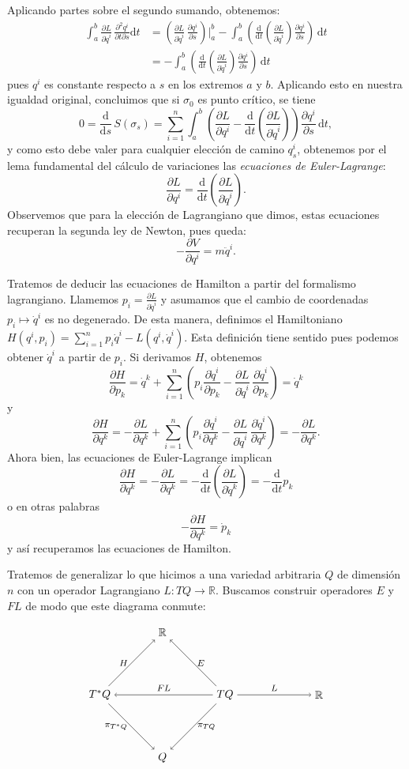 \documentclass[11pt, a4paper]{article}
\newcommand{\RR}{\mathbb{R}}
\newcommand{\dd}{\mathrm{d}}
\newcommand{\ddt}{\frac{\dd}{\dd t}}
\newcommand{\dds}{\frac{\dd}{\dd s}}
\newcommand{\pardev}[2]{\frac{\partial #1}{\partial #2}}
\theoremstyle{plain}
\theoremstyle{definition}
\begin{document}
Aplicando partes sobre el segundo sumando, obtenemos:
\begin{align*}
\int_a^b \pardev{L}{\dot{q}^i}\,\frac{\partial^2 q^i}{\partial t\partial s}\dd t &= \left(\pardev{L}{\dot{q}^i}\,\pardev{q^i}{s}\right)\bigg|_a^b - \int_a^b \left(\ddt\!\left(\pardev{L}{\dot{q}^i}\right)\pardev{q^i}{s}\right)\,\dd t\\
&=- \int_a^b \left(\ddt\!\left(\pardev{L}{\dot{q}^i}\right)\pardev{q^i}{s}\right)\,\dd t
\end{align*}
pues $q^i$ es constante respecto a $s$ en los extremos $a$ y $b$. Aplicando esto en nuestra igualdad original, concluimos que si $\sigma_0$ es punto crítico, se tiene
\[0=\dds\,S(\sigma_s) = \sum_{i=1}^n \int_a^b  \left(\pardev{L}{q^i} - \ddt\!\left(\pardev{L}{\dot{q}^i} \right) \right)\pardev{q^i}{s}\, \dd t,\]
y como esto debe valer para cualquier elección de camino $q_s^i$, obtenemos por el lema fundamental del cálculo de variaciones las \emph{ecuaciones de Euler-Lagrange}:
\[\pardev{L}{q^i} = \ddt\!\left(\pardev{L}{\dot{q}^i}\right).\]
Observemos que para la elección de Lagrangiano que dimos, estas ecuaciones recuperan la segunda ley de Newton, pues queda:
\[-\pardev{V}{q^i} = m\ddot{q}^i.\]

Tratemos de deducir las ecuaciones de Hamilton a partir del formalismo lagrangiano. Llamemos $p_i=\pardev{L}{\dot{q}^i}$ y asumamos que el cambio de coordenadas $p_i\mapsto \dot{q}^i$ es no degenerado. De esta manera, definimos el Hamiltoniano $H(q^i,p_i) = \sum_{i=1}^n p_i\dot{q}^i - L(q^i,\dot{q}^i)$. Esta definición tiene sentido pues podemos obtener $\dot{q}^i$ a partir de $p_i$. Si derivamos $H$, obtenemos
\[\pardev{H}{p_k} = \dot{q}^k + \sum_{i=1}^n \left(p_i\pardev{\dot{q}^i}{p_k} -\pardev{L}{\dot{q}^i}\,\pardev{\dot{q}^i}{p_k}\right)=\dot{q}^k\]
y
\[\pardev{H}{q^k} =  -\pardev{L}{q^k}+\sum_{i=1}^n \left(p_i\pardev{\dot{q}^i}{q^k}-\pardev{L}{\dot{q}^i}\,\pardev{\dot{q}^i}{q^k}\right)=-\pardev{L}{q^k}.\]
Ahora bien, las ecuaciones de Euler-Lagrange implican
\[\pardev{H}{q^k}=-\pardev{L}{q^k}=-\ddt\!\left(\pardev{L}{\dot{q}^k}\right) = -\ddt p_k\]
o en otras palabras
\[-\pardev{H}{q^k}=\dot{p}_k\]
y así recuperamos las ecuaciones de Hamilton.

Tratemos de generalizar lo que hicimos a una variedad arbitraria $Q$ de dimensión $n$ con un operador Lagrangiano $L:TQ\to \RR$. Buscamos construir operadores $E$ y $FL$ de modo que este diagrama conmute:

\[
\begin{tikzpicture}
\node (R1) at (0,0) {$\RR$};
\node (cotg) at (-2,-2) {$T^*Q$};
\node (tg) at (2,-2) {$TQ$};
\node (Q) at (0,-4) {$Q$};
\node (R2) at (5,-2) {$\RR$};

\draw[->] (tg) to node[above, font=\footnotesize]{$L$} (R2);
\draw[->] (tg) to node[right, font=\footnotesize]{$\pi_{TQ}$} (Q);
\draw[->] (tg) to node[above, font=\footnotesize]{$FL$} (cotg);
\draw[->] (cotg) to node[left, font=\footnotesize]{$\pi_{T^*Q}$} (Q);
\draw[->] (cotg) to node[left, font=\footnotesize]{$H$} (R1);
\draw[->] (tg) to node[right, font=\footnotesize]{$E$} (R1);
\end{tikzpicture}
\]
\end{document}
